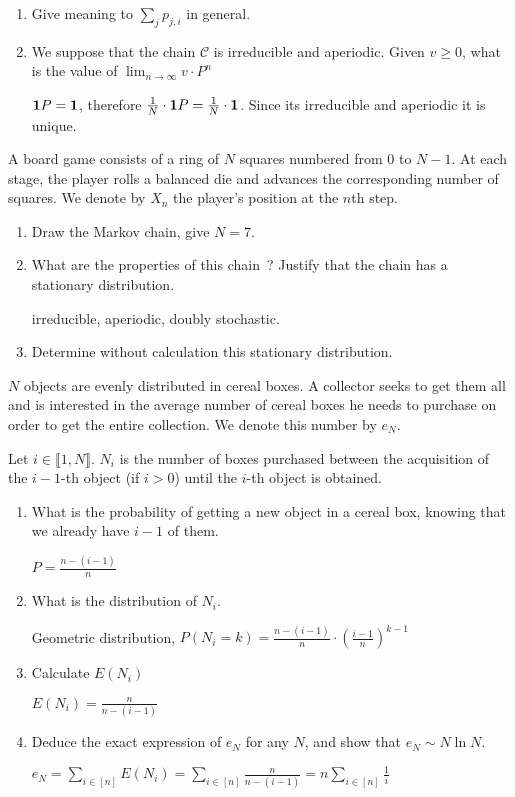 \documentclass[a4paper,11pt]{exam}
\begin{document}
\begin{questions}
\begin{enumerate}
	\item Give meaning to $\sum_j p_{j,i}$ in general.
	\item We suppose that the chain $ \mathcal{C} $ is irreducible and aperiodic.
	Given $v\geq0$, what is the value of $\lim_{n\rightarrow\infty}v\cdot P^n$
	\begin{solution}
		${\bf 1}P={\bf 1}$, therefore $\frac{1}{N}\cdot{\bf 1}P=\frac{1}{N}\cdot{\bf 1}$. Since its irreducible and aperiodic it is unique.
	\end{solution}
\end{enumerate}
%
\question
A board game consists of a ring of $ N $ squares numbered from $ 0 $ to $ N-1 $.
At each stage, the player rolls a balanced die and advances the corresponding number of squares.
We denote by $ X_n $ the player's position at the $n$th step.
\begin{enumerate}
	\item Draw the Markov chain, give $N=7$.
	\item What are the properties of this chain~? Justify that the chain has a stationary distribution.
	\begin{solution}
		irreducible, aperiodic, doubly stochastic.
	\end{solution}
	\item Determine without calculation this stationary distribution.
\end{enumerate}


\question
$ N $ objects are evenly distributed in cereal boxes.
A collector seeks to get them all and is interested in the average number of cereal boxes he needs to purchase on order to get the entire collection. We denote this number by $e_N$.


Let $i \in \llbracket 1,N\rrbracket .$
$ N_i $ is the number of boxes purchased between the acquisition of the $ i-1 $-th object (if $ i> 0 $) until the $ i $-th object is obtained.

\begin{enumerate}
	\item What is the probability of getting a new object in a cereal box, knowing that we already have $i-1$ of them.
	\begin{solution}
		$P=\frac{n-(i-1)}{n}$
	\end{solution}
	\item What is the distribution of $N_i$.
	\begin{solution}
		Geometric distribution, 
		$P(N_i=k)=\frac{n-(i-1)}{n}\cdot(\frac{i-1}{n})^{k-1} $
	\end{solution}
	\item Calculate $E(N_i)$
	\begin{solution}
		$E(N_i)=\frac{n}{n-(i-1)}$
	\end{solution}
	\item  Deduce the exact expression of $ e_N $ for any $N$, and show that
	$e_N \sim N\ln{N}$.
	\begin{solution}
		$e_N=\sum_{i\in[n]} E(N_i)=\sum_{i\in[n]} \frac{n}{n-(i-1)}=n\sum_{i\in[n]} \frac{1}{i}$  
		

\end{solution}
\end{enumerate}
\end{questions}
\end{document}
